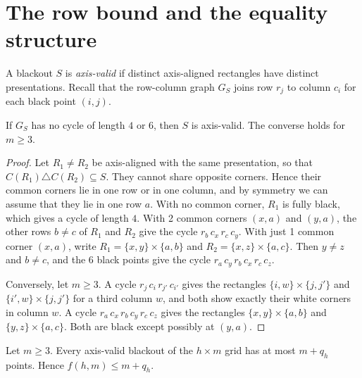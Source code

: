 \section{The row bound and the equality structure}\label{sec:graph}

A blackout $S$ is \emph{axis-valid} if distinct axis-aligned rectangles have distinct
presentations. Recall that the row-column graph $G_S$ joins row $r_j$ to column $c_i$ for
each black point $(i,j)$.

\begin{lemma}\label{lem:girth}
If $G_S$ has no cycle of length $4$ or $6$, then $S$ is axis-valid. The converse holds for
$m\ge3$.
\end{lemma}

\begin{proof}
Let $R_1\ne R_2$ be axis-aligned with the same presentation, so that
$C(R_1)\triangle C(R_2)\subseteq S$. They cannot share opposite corners. Hence their common
corners lie in one row or in one column, and by symmetry we can assume that they lie in one
row $a$. With no common corner, $R_1$ is fully black, which gives a cycle of length $4$.
With 2 common corners $(x,a)$ and $(y,a)$, the other rows $b\ne c$ of $R_1$ and $R_2$ give
the cycle $r_b\,c_x\,r_c\,c_y$. With just 1 common corner $(x,a)$, write
$R_1=\{x,y\}\times\{a,b\}$ and $R_2=\{x,z\}\times\{a,c\}$. Then $y\ne z$ and $b\ne c$, and
the 6 black points give the cycle $r_a\,c_y\,r_b\,c_x\,r_c\,c_z$.

Conversely, let $m\ge3$. A cycle $r_j\,c_i\,r_{j'}\,c_{i'}$ gives the rectangles
$\{i,w\}\times\{j,j'\}$ and $\{i',w\}\times\{j,j'\}$ for a third column $w$, and both show
exactly their white corners in column $w$. A cycle $r_a\,c_x\,r_b\,c_y\,r_c\,c_z$ gives the
rectangles $\{x,y\}\times\{a,b\}$ and $\{y,z\}\times\{a,c\}$. Both are black except possibly
at $(y,a)$.
\end{proof}

\begin{theorem}\label{thm:rowbound}
Let $m\ge3$. Every axis-valid blackout of the $h\times m$ grid has at most $m+q_h$ points.
Hence $f(h,m)\le m+q_h$.
\end{theorem}

